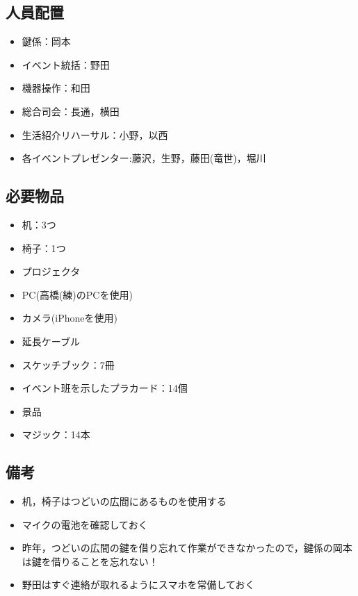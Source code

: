 \subsection{人員配置}
\begin{itemize}
\item 鍵係：岡本
\item イベント統括：野田
\item 機器操作：和田
\item 総合司会：長通，横田
\item 生活紹介リハーサル：小野，以西
\item 各イベントプレゼンター:藤沢，生野，藤田(竜世)，堀川
\end{itemize}




\subsection{必要物品}
\begin{itemize}
\item 机：3つ
\item 椅子：1つ
\item プロジェクタ
\item PC(高橋(練)のPCを使用)
\item カメラ(iPhoneを使用)
\item 延長ケーブル
\item スケッチブック：7冊
\item イベント班を示したプラカード：14個
\item 景品
\item マジック：14本
\end{itemize}


\subsection{備考}
\begin{itemize}
\item 机，椅子はつどいの広間にあるものを使用する
\item マイクの電池を確認しておく
\item 昨年，つどいの広間の鍵を借り忘れて作業ができなかったので，鍵係の岡本は鍵を借りることを忘れない！
\item 野田はすぐ連絡が取れるようにスマホを常備しておく
\end{itemize}

%

